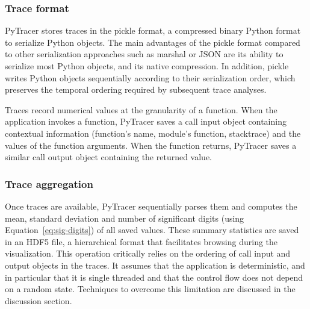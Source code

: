 \documentclass[11pt]{article}
\newcommand{\pytracer}[0]{PyTracer\xspace}
\begin{document}

\subsubsection{Trace format}

\pytracer stores traces in the pickle format, a compressed binary Python format to serialize Python objects.
The main advantages of the pickle format compared to other serialization approaches such as marshal or JSON are its ability to serialize most Python objects, and its native compression.  In addition, pickle writes Python objects sequentially according to their serialization order, which preserves the temporal ordering required by subsequent trace analyses.

Traces record numerical values at the granularity of a function. When the application invokes a function, \pytracer saves a call input object containing contextual information (function's name, module's function, stacktrace) and the values of the function arguments. When the function returns, \pytracer saves a similar call output object containing the returned value. 



\subsubsection{Trace aggregation}

Once traces are available, \pytracer sequentially parses them and computes the mean, standard deviation and
number of significant digits (using Equation~\ref{eq:sig-digits}) of all saved values. These summary statistics are saved in an HDF5 file,
a hierarchical format that facilitates browsing during the visualization.
This operation critically relies on the ordering of call input and output objects in the traces. It assumes that the application is deterministic, and in particular that it is single threaded and that the control flow does not depend on a random state. Techniques to overcome this limitation are discussed in the discussion section.
\end{document}

